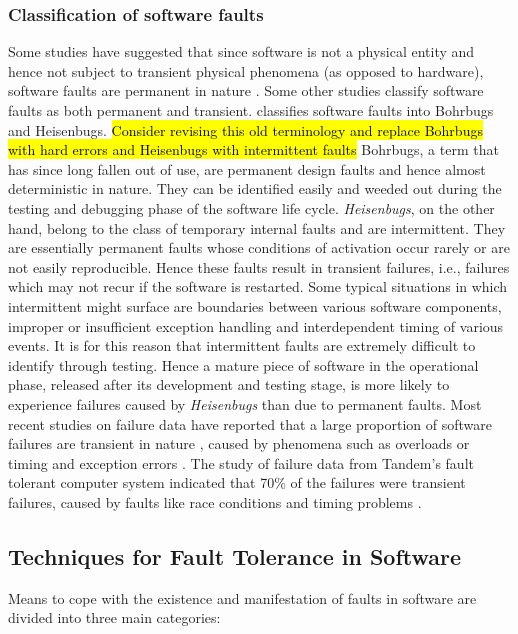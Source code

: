 \documentclass[a4paper, 11pt]{article}
\begin{document}
\subsubsection{Classification of software faults}
Some studies have suggested that since software is not a physical entity and hence not subject to transient physical phenomena (as opposed to hardware), software faults are permanent in nature \citep{huang1994two}. Some other studies classify software faults as both permanent and transient. \citet{gray1986computers} classifies software faults into Bohrbugs and Heisenbugs. \hl{Consider revising this old terminology and replace Bohrbugs with hard errors and Heisenbugs with intermittent faults} Bohrbugs, a term that has since long fallen out of use, are permanent design faults and hence almost deterministic in nature. They can be identified easily and weeded out during the testing and debugging phase of the software life cycle. \emph{Heisenbugs}, on the other hand, belong to the class of temporary internal faults and are intermittent. They are essentially permanent faults whose conditions of activation occur rarely or are not easily reproducible. Hence these faults result in transient failures, i.e., failures which may not recur if the software is restarted. Some typical situations in which intermittent might surface are boundaries between various software components, improper or insufficient exception handling and interdependent timing of various events. It is for this reason that intermittent faults are extremely difficult to identify through testing. Hence a mature piece of software in the operational phase, released after its development and testing stage, is more likely to experience failures caused by \emph{Heisenbugs} than due to permanent faults. Most recent studies on failure data have reported that a large proportion of software failures are transient in nature \citep{gray1990census}, caused by phenomena such as overloads or timing and exception errors \citep{chillarege1995measurement}. The study of failure data from Tandem's fault tolerant computer system indicated that 70\% of the failures were transient failures, caused by faults like race conditions and timing problems \citep{lee1995software}.

\subsection{Techniques for Fault Tolerance in Software}
Means to cope with the existence and manifestation of faults in software are divided into three main categories:
\end{document}
